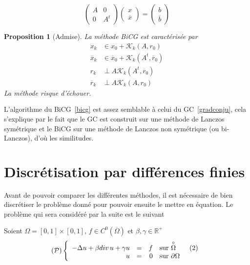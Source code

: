 \documentclass[twoside,12pt]{report}
\newtheorem{prop}{Proposition}
\theoremstyle{remark}
\begin{document}
\begin{equation}
\label{sysbicg}
\begin{pmatrix}
A & 0 \\
0 & A^t
\end{pmatrix}
\begin{pmatrix}
x \\
\overline{x}
\end{pmatrix}
=
\begin{pmatrix}
b \\
\overline{b}
\end{pmatrix}
\end{equation}

\begin{prop}[Admise]
La méthode BiCG est caractérisée par
\begin{align*}
x_k &\in x_0 + \mathcal{K}_k(A,r_0) \\
\overline{x}_k &\in \overline{x}_0 + \mathcal{K}_k(A^t,\overline{r}_0) \\
r_k &\perp A\mathcal{K}_k(A^t,\overline{r}_0) \\
\overline{r}_k &\perp A\mathcal{K}_k(A,r_0)
\end{align*}
La méthode risque d'échouer.
\end{prop}

L'algorithme du BiCG~\ref{bicg} est assez semblable à celui du GC~\ref{gradconju}, cela s'explique par le fait que le GC est construit sur une méthode de Lanczos symétrique et le BiCG sur une méthode de Lanczos non symétrique (ou bi-Lanczos), d'où les similitudes.
\newpage
\chapter{Discrétisation par différences finies}

Avant de pouvoir comparer les différentes méthodes, il est nécessaire de bien discrétiser le problème donné pour pouvoir ensuite le mettre en équation. Le problème qui sera considéré par la suite est le suivant

Soient $\Omega=[0,1]\times [0,1]$, $f\in C^0(\overline{\Omega})$ et $\beta , \gamma \in \mathbb{R}^{+}$
\begin{equation}
(\mathcal{P})
\left\lbrace
\begin{array}{r r r l}
-\Delta u + \beta div\,u + \gamma u &=& f & \mbox{sur $\overset{\circ}{\Omega}$} \label{equa} \tag{2}\\
u &=& 0 & \mbox{sur $\partial\Omega$}\\
\end{array}\right.
\end{equation}
\end{document}
